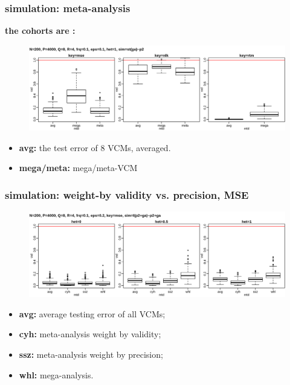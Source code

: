 \documentclass{beamer}
\begin{document}
\begin{frame}%
  \frametitle{simulation: meta-analysis} %
  \textbf{the cohorts are \color{red}{heterogeneous}:} \\
  \begin{figure}
    \centering \includegraphics[width=.95\linewidth]{img/met_het_stt_mnq_ssz}
  \end{figure}
  \textbf{\color{blue}{inner plot: strategies, from left to right:}}
  \begin{itemize}
  \item \textbf{avg:} the test error of 8 VCMs, averaged.
  \item \textbf{mega/meta:} mega/meta-VCM
  \end{itemize}
\end{frame}
\begin{frame}%
  \frametitle{simulation: weight-by validity vs. precision, MSE} %
  \begin{figure}
    \centering \includegraphics[width=1.0\linewidth]{img/met_mnq_cyh_mse}
  \end{figure}
  \textbf{\color{blue}{inner plot: strategies, from left to right:}}
  \begin{itemize}
  \item \textbf{avg:} average testing error of all VCMs;
  \item \textbf{cyh:} meta-analysis weight by validity;
  \item \textbf{ssz:} meta-analysis weight by precision;
  \item \textbf{whl:} mega-analysis.
  \end{itemize}
\end{frame}
\end{document}
